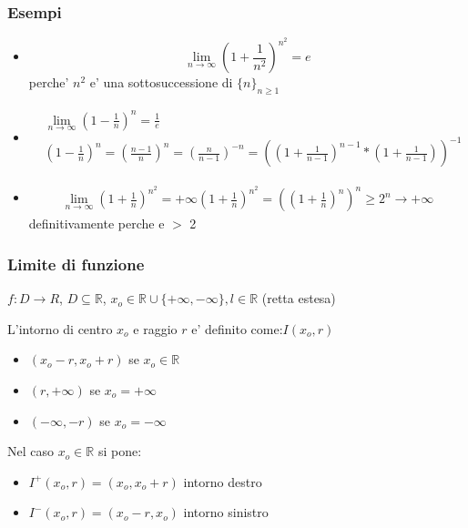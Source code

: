 \documentclass{article}
\begin{document}
        \subsubsection{Esempi}
        \begin{flushleft}
            \begin{itemize}
                \item
                    \begin{equation}
                        \lim_{n \to \infty} (1+\frac{1}{n^2})^{n^2} = e
                    \end{equation}
                    perche' $n^2$ e' una sottosuccessione di $\{n\}_{n\geq 1}$
                \item
                    \begin{equation}
                        \begin{aligned}
                            &  \lim_{n \to \infty} (1-\frac{1}{n})^{n} = \frac{1}{e} \\
                            &  (1-\frac{1}{n})^n=(\frac{n-1}{n})^n=(\frac{n}{n-1})^{-n}=((1+\frac{1}{n-1})^{n-1}*(1+\frac{1}{n-1}))^{-1}
                        \end{aligned}
                    \end{equation}
                \item
                    \begin{equation}
                        \begin{aligned}
                            \lim_{n \to \infty} (1+\frac{1}{n})^{n^2} = +\infty
                            (1+\frac{1}{n})^{n^2}=((1+\frac{1}{n})^{n})^n \geq 2^n \to +\infty
                        \end{aligned}
                    \end{equation}
                    definitivamente perche e $>$ 2
            \end{itemize}
        \end{flushleft}
        \subsubsection{Limite di funzione}
        \begin{flushleft}
            $f:D \to R$, $D\subseteq \mathbb{R}$, $x_o \in \mathbb{R}\cup \{+\infty,-\infty\},l\in \mathbb{R}$ (retta estesa)
        \end{flushleft}
        L'intorno di centro $x_o$ e raggio $r$ e' definito come:$I(x_o,r)$
        \begin{itemize}
            \item $(x_o-r,x_o+r)$ se $x_o \in \mathbb{R}$
            \item $(r,+\infty)$ se $x_o = +\infty$
            \item $(-\infty,-r)$ se $x_o = -\infty$
        \end{itemize}
        Nel caso $x_o \in \mathbb{R}$ si pone:
        \begin{itemize}
            \item $I^+(x_o,r)=(x_o,x_o+r)$ intorno destro
            \item $I^-(x_o,r)=(x_o-r,x_o)$ intorno sinistro
        \end{itemize}
\end{document}
